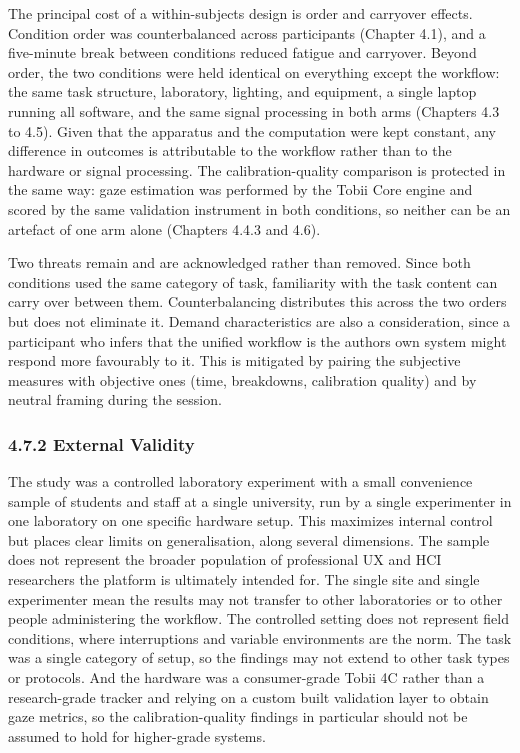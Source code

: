 \documentclass[
]{article}
\begin{document}
The principal cost of a within-subjects design is order and carryover effects. Condition order was counterbalanced across participants (Chapter 4.1), and a five-minute break between conditions reduced fatigue and carryover. Beyond order, the two conditions were held identical on everything except the workflow: the same task structure, laboratory, lighting, and equipment, a single laptop running all software, and the same signal processing in both arms (Chapters 4.3 to 4.5). Given that the apparatus and the computation were kept constant, any difference in outcomes is attributable to the workflow rather than to the hardware or signal processing. The calibration-quality comparison is protected in the same way: gaze estimation was performed by the Tobii Core engine and scored by the same validation instrument in both conditions, so neither can be an artefact of one arm alone (Chapters 4.4.3 and 4.6).

Two threats remain and are acknowledged rather than removed. Since both conditions used the same category of task, familiarity with the task content can carry over between them. Counterbalancing distributes this across the two orders but does not eliminate it. Demand characteristics are also a consideration, since a participant who infers that the unified workflow is the author\textquotesingle s own system might respond more favourably to it. This is mitigated by pairing the subjective measures with objective ones (time, breakdowns, calibration quality) and by neutral framing during the session.

\hypertarget{external-validity}{%
\subsubsection{4.7.2 External Validity}\label{external-validity}}

The study was a controlled laboratory experiment with a small convenience sample of students and staff at a single university, run by a single experimenter in one laboratory on one specific hardware setup. This maximizes internal control but places clear limits on generalisation, along several dimensions. The sample does not represent the broader population of professional UX and HCI researchers the platform is ultimately intended for. The single site and single experimenter mean the results may not transfer to other laboratories or to other people administering the workflow. The controlled setting does not represent field conditions, where interruptions and variable environments are the norm. The task was a single category of setup, so the findings may not extend to other task types or protocols. And the hardware was a consumer-grade Tobii 4C rather than a research-grade tracker and relying on a custom built validation layer to obtain gaze metrics, so the calibration-quality findings in particular should not be assumed to hold for higher-grade systems.
\end{document}
